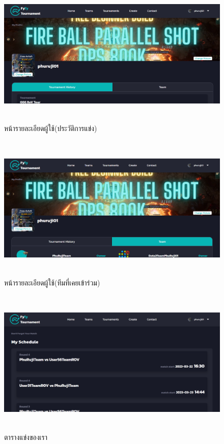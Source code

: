     \begin{figure}[ht]
      \begin{center}
      \includegraphics[width=18cm,height=7cm,keepaspectratio]{user_th.png}
      \end{center}
      \caption[หน้ารายละเอียดผู้ใช้(ประวัติการแข่ง)]{หน้ารายละเอียดผู้ใช้(ประวัติการแข่ง)}
      \label{fig:หน้ารายละเอียดผู้ใช้(ประวัติการแข่ง)}
    \end{figure}
    \begin{figure}[ht]
      \begin{center}
      \includegraphics[width=18cm,height=7cm,keepaspectratio]{user_tj.png}
      \end{center}
      \caption[หน้ารายละเอียดผู้ใช้(ทีมที่เคยเข้าร่วม)]{หน้ารายละเอียดผู้ใช้(ทีมที่เคยเข้าร่วม)}
      \label{fig:หน้ารายละเอียดผู้ใช้(ทีมที่เคยเข้าร่วม)}
    \end{figure}

    \begin{figure}[ht]
      \begin{center}
      \includegraphics[width=18cm,height=7cm,keepaspectratio]{schedule.png}
      \end{center}
      \caption[ตารางแข่งของเรา]{ตารางแข่งของเรา}
      \label{fig:ตารางแข่งของเรา}
    \end{figure}



